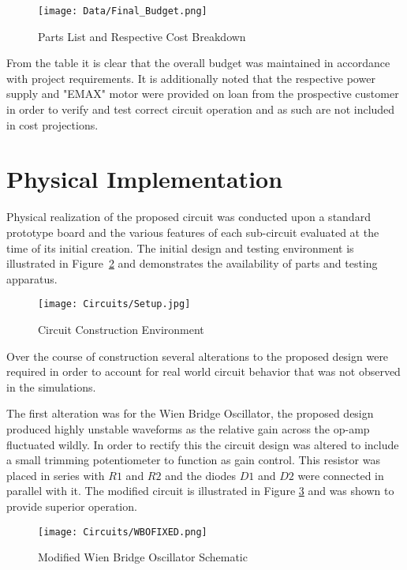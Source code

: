 \documentclass[12pt]{article}
\begin{document}
\begin{figure}[H]
\centering
\caption{Parts List and Respective Cost Breakdown}
\texttt{[image: Data/Final\_Budget.png]}
\label{budget}
\end{figure}

From the table it is clear that the overall budget was maintained in accordance with project requirements. It is additionally noted that the respective power supply and "EMAX" motor were provided on loan from the prospective customer in order to verify and test correct circuit operation and as such are not included in cost projections.%

\section{Physical Implementation}%

Physical realization of the proposed circuit was conducted upon a standard prototype board and the various features of each sub-circuit evaluated at the time of its initial creation. The initial design and testing environment is illustrated in Figure~\ref{Setup} and demonstrates the availability of parts and testing apparatus.

\begin{figure}[H]
\centering
\caption{Circuit Construction Environment}
\texttt{[image: Circuits/Setup.jpg]}
\label{Setup}
\end{figure}

Over the course of construction several alterations to the proposed design were required in order to account for real world circuit behavior that was not observed in the simulations.

The first alteration was for the Wien Bridge Oscillator, the proposed design produced highly unstable waveforms as the relative gain across the op-amp fluctuated wildly. In order to rectify this the circuit design was altered to include a small trimming potentiometer to function as gain control. This resistor was placed in series with $R1$ and $R2$ and the diodes $D1$ and $D2$ were connected in parallel with it. The modified circuit is illustrated in Figure \ref{WBOFIXED} and was shown to provide superior operation. 

\begin{figure}[H]
\centering
\caption{Modified Wien Bridge Oscillator Schematic}
\texttt{[image: Circuits/WBOFIXED.png]}
\label{WBOFIXED}
\end{figure}
\end{document}
